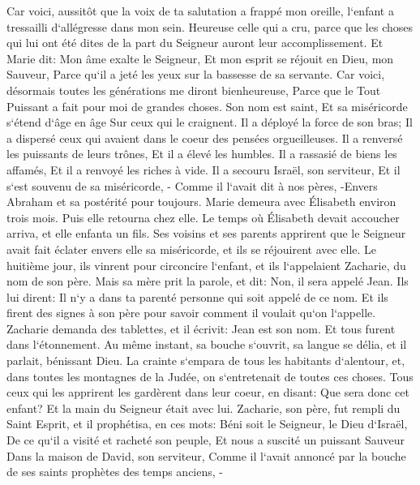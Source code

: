 \verse Car voici, aussitôt que la voix de ta salutation a frappé mon oreille, l`enfant a tressailli d`allégresse dans mon sein. 
\verse Heureuse celle qui a cru, parce que les choses qui lui ont été dites de la part du Seigneur auront leur accomplissement. 
\verse Et Marie dit: Mon âme exalte le Seigneur, 
\verse Et mon esprit se réjouit en Dieu, mon Sauveur, 
\verse Parce qu`il a jeté les yeux sur la bassesse de sa servante. Car voici, désormais toutes les générations me diront bienheureuse, 
\verse Parce que le Tout Puissant a fait pour moi de grandes choses. Son nom est saint, 
\verse Et sa miséricorde s`étend d`âge en âge Sur ceux qui le craignent. 
\verse Il a déployé la force de son bras; Il a dispersé ceux qui avaient dans le coeur des pensées orgueilleuses. 
\verse Il a renversé les puissants de leurs trônes, Et il a élevé les humbles. 
\verse Il a rassasié de biens les affamés, Et il a renvoyé les riches à vide. 
\verse Il a secouru Israël, son serviteur, Et il s`est souvenu de sa miséricorde, - 
\verse Comme il l`avait dit à nos pères, -Envers Abraham et sa postérité pour toujours. 
\verse Marie demeura avec Élisabeth environ trois mois. Puis elle retourna chez elle. 
\verse Le temps où Élisabeth devait accoucher arriva, et elle enfanta un fils. 
\verse Ses voisins et ses parents apprirent que le Seigneur avait fait éclater envers elle sa miséricorde, et ils se réjouirent avec elle. 
\verse Le huitième jour, ils vinrent pour circoncire l`enfant, et ils l`appelaient Zacharie, du nom de son père. 
\verse Mais sa mère prit la parole, et dit: Non, il sera appelé Jean. 
\verse Ils lui dirent: Il n`y a dans ta parenté personne qui soit appelé de ce nom. 
\verse Et ils firent des signes à son père pour savoir comment il voulait qu`on l`appelle. 
\verse Zacharie demanda des tablettes, et il écrivit: Jean est son nom. Et tous furent dans l`étonnement. 
\verse Au même instant, sa bouche s`ouvrit, sa langue se délia, et il parlait, bénissant Dieu. 
\verse La crainte s`empara de tous les habitants d`alentour, et, dans toutes les montagnes de la Judée, on s`entretenait de toutes ces choses. 
\verse Tous ceux qui les apprirent les gardèrent dans leur coeur, en disant: Que sera donc cet enfant? Et la main du Seigneur était avec lui. 
\verse Zacharie, son père, fut rempli du Saint Esprit, et il prophétisa, en ces mots: 
\verse Béni soit le Seigneur, le Dieu d`Israël, De ce qu`il a visité et racheté son peuple, 
\verse Et nous a suscité un puissant Sauveur Dans la maison de David, son serviteur, 
\verse Comme il l`avait annoncé par la bouche de ses saints prophètes des temps anciens, - 
